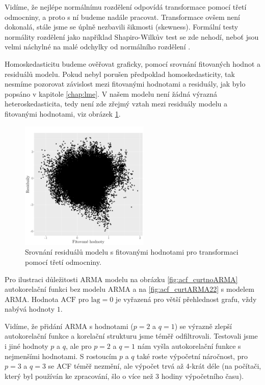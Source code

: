 Vidíme, že nejlépe normálnímu rozdělení odpovídá transformace pomocí třetí odmocniny, a proto s ní budeme nadále pracovat. Transformace ovšem není dokonalá, stále jsme se úplně nezbavili šikmosti (skewness). Formální testy normálity rozdělení jako například Shapiro-Wilkův test se zde nehodí, neboť jsou velmi náchylné na malé odchylky od normálního rozdělení \parencite{shapirowilk}.

Homoskedasticitu budeme ověřovat graficky, pomocí srovnání fitovaných hodnot a residuálů modelu. Pokud nebyl porušen předpoklad homoskedasticity, tak nesmíme pozorovat závislost mezi fitovanými hodnotami a residuály, jak bylo popsáno v kapitole \ref{chap:lme}. V našem modelu není žádná výrazná heteroskedasticita, tedy není zde zřejmý vztah mezi residuály modelu a fitovanými hodnotami, viz obrázek \ref{fig:resvsfit_curt}.

\begin{figure}
	\centering
  \includegraphics[width=0.55\textwidth]{img/ch2/modmax15cm_curt.png}
	\caption{Srovnání residuálů modelu s fitovanými hodnotami pro transformaci pomocí třetí odmocniny.}
	\label{fig:resvsfit_curt}
\end{figure}

Pro ilustraci důležitosti ARMA modelu na obrázku \ref{fig:acf_curtnoARMA} autokorelační funkci bez modelu ARMA a na \ref{fig:acf_curtARMA22} s modelem ARMA. Hodnota $\text{ACF}$ pro $\text{lag}=0$ je vyřazená pro větší přehlednost grafu, vždy nabývá hodnoty $1$.

Vidíme, že přidání ARMA s hodnotami ($p=2$ a $q=1$) se výrazně zlepší autokorelační funkce a korelační strukturu jsme téměř odfiltrovali. Testovali jsme i jiné hodnoty $p$ a $q$, ale pro $p=2$ a $q=1$ nám vyšla autokorelační funkce s nejmenšími hodnotami. S rostoucím $p$ a $q$ také roste výpočetní náročnost, pro $p=3$ a $q=3$ se ACF téměř nezmění, ale výpočet trvá až 4-krát déle (na počítači, který byl používán ke zpracování, šlo o více než 3 hodiny výpočetního času).

